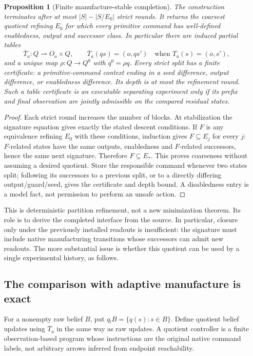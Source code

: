 \documentclass[11pt]{article}
\newtheorem{proposition}[theorem]{Proposition}
\theoremstyle{definition}
\theoremstyle{remark}
\begin{document}
\begin{proposition}[Finite manufacture-stable completion]
\label{msc:prop:completion}
The construction terminates after at most $|S|-|S/E_0|$ strict rounds. It
returns the coarsest quotient refining $E_0$ for which every primitive
command has well-defined enabledness, output and successor class. In
particular there are induced partial tables
\[
 \overline T_a:Q\rightharpoonup O_a\times Q,
 \qquad \overline T_a(qs)=(o,qs')\quad\text{when }T_a(s)=(o,s'),
\]
and a unique map $\rho:Q\to Q^0$ with $q^0=\rho q$.
Every strict split has a finite certificate: a primitive-command context
ending in a seed difference, output difference, or enabledness difference.
Its depth is at most the refinement round. Such a table certificate is an
executable separating experiment only if its prefix and final observation
are jointly admissible on the compared residual states.
\end{proposition}
\begin{proof}
Each strict round increases the number of blocks. At stabilization the
signature equation gives exactly the stated descent conditions. If $F$ is
any equivalence refining $E_0$ with these conditions, induction gives
$F\subseteq E_j$ for every $j$: $F$-related states have the same outputs,
enabledness and $F$-related successors, hence the same next signature.
Therefore $F\subseteq E_*$. This proves coarseness without assuming a
desired quotient. Store the responsible command whenever two states split;
following its successors to a previous split, or to a directly differing
output/guard/seed, gives the certificate and depth bound. A disabledness
entry is a model fact, not permission to perform an unsafe action.
\end{proof}

This is deterministic partition refinement, not a new minimization theorem.
Its role is to derive the completed interface from the source. In particular,
closure only under the previously installed readouts is insufficient: the
signature must include native manufacturing transitions whose successors
can admit new readouts. The more substantial issue is whether this quotient
can be used by a single experimental history, as follows.

\subsection{The comparison with adaptive manufacture is exact}
For a nonempty raw belief $B$, put $q_!B=\{q(s):s\in B\}$. Define quotient
belief updates using $\overline T_a$ in the same way as raw updates. A
quotient controller is a finite observation-based program whose instructions
are the original native command labels, not arbitrary arrows inferred from
endpoint reachability.
\end{document}
